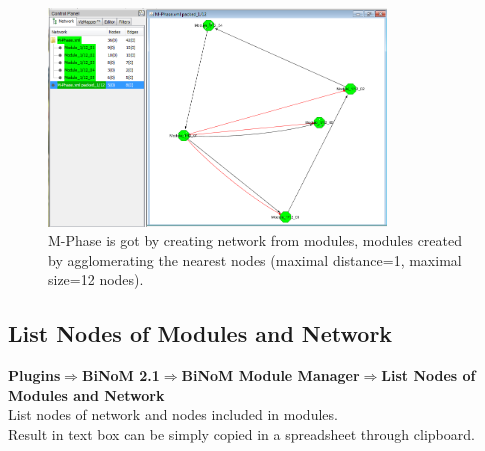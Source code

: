 \begin{figure}
\centering
\includegraphics[width=0.8\textwidth]{graphics/M-Phase_packed}
\caption{M-Phase is got by creating network from modules, modules created by agglomerating the nearest nodes (maximal distance=1, maximal size=12 nodes).}
\label{M-Phase_packed}
\end{figure}

\subsection{List Nodes of Modules and Network}
\textbf{Plugins$\Rightarrow$BiNoM 2.1$\Rightarrow$BiNoM Module Manager$\Rightarrow$List Nodes of Modules and Network}\\
List nodes of network and nodes included in modules.\\
Result in text box can be simply copied in a spreadsheet through clipboard.

